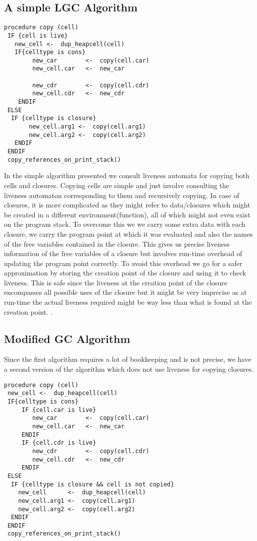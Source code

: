 \documentclass[9pt]{sigplanconf}
\newcommand{\cred}[1]{{\color{red}{#1}}}
\begin{document}
\subsection{A simple LGC Algorithm}
\cred{Introduce terminology}
\begin{verbatim}
procedure copy (cell)
 IF {cell is live}
   new_cell <-  dup_heapcell(cell)
   IF{celltype is cons}
        new_car        <-  copy(cell.car)
        new_cell.car   <-  new_car
      
        new_cdr        <-  copy(cell.cdr)
        new_cell.cdr   <-  new_cdr
    ENDIF
 ELSE
  IF {celltype is closure}
       new_cell.arg1 <-  copy(cell.arg1)
       new_cell.arg2 <-  copy(cell.arg2)
   ENDIF
 ENDIF
 copy_references_on_print_stack()
\end{verbatim}
In  the simple algorithm  presented we  consult liveness  automata for
copying both \CONS cells and closures.  Copying \CONS cells are simple
and just  involve consulting  the liveness automaton  corresponding to
them  and  recursively  copying.  In  case of  closures,  it  is  more
complicated  as  they might  refer  to  data/closures  which might  be
created in  a different environment(function), all of  which might not
even exist  on the program  stack. To overcome  this we we  carry some
extra data with  each closure, we carry the program  point at which it
was evaluated  and also the names  of the free  variables contained in
the closure.  This gives us  precise liveness information of  the free
variables of a closure but  involves run-time overhead of updating the
program  point correctly. To  avoid this  overhead we  go for  a safer
approximation by storing  the creation point of the  closure and using
it to check liveness.  This is safe since the liveness at the creation
point of the closure encompasses  all possible uses of the closure but
it might be very imprecise as at run-time the actual liveness required
might   be   way  less   than   what   is   found  at   the   creation
point. \cred{repeated traversals if sharing}.

\subsection{Modified GC Algorithm}
Since the first algorithm requires a lot of bookkeeping and is not
precise, we have a second version of the algorithm 
which does not use liveness for copying closures. 
\begin{verbatim}
procedure copy (cell)
 new_cell <-  dup_heapcell(cell)
 IF{celltype is cons}
     IF {cell.car is live}
        new_car        <-  copy(cell.car)
        new_cell.car   <-  new_car
     ENDIF
     IF {cell.cdr is live}
        new_cdr        <-  copy(cell.cdr)
        new_cell.cdr   <-  new_cdr
     ENDIF
 ELSE
  IF {celltype is closure && cell is not copied}
    new_cell      <-  dup_heapcell(cell)
    new_cell.arg1 <-  copy(cell.arg1)
    new_cell.arg2 <-  copy(cell.arg2)
  ENDIF
 ENDIF
 copy_references_on_print_stack()
\end{verbatim}
\end{document}
